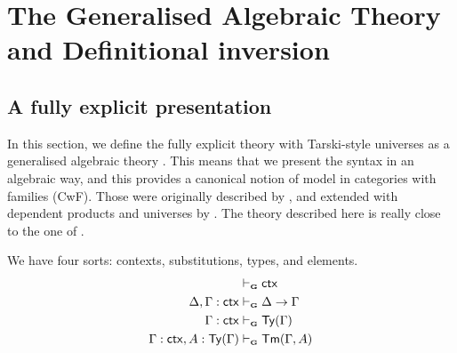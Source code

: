 \section{The Generalised Algebraic Theory and Definitional inversion}\label{GAT}

\subsection{A fully explicit presentation}

In this section, we define the fully explicit theory with Tarski-style universes as a generalised algebraic theory \ThyGAT.
This means that we present the syntax in an algebraic way, and this provides a canonical notion of model in categories with families (CwF). Those
were originally described by \citet{Cartmell}, and extended with dependent products and universes by \citet{CWF-CCD}.
The theory described here is really close to the one of \citet{bcde2026}.

\begin{definition}[Sorts]
We have four sorts: contexts, substitutions, types, and elements. 
\begin{align*}
    &\vdashG \ctx\\
    \Delta, \Gamma : \ctx &\vdashG \Delta \rightarrow \Gamma\\
    \Gamma : \ctx &\vdashG \Type(\Gamma)\\
    \Gamma : \ctx, A : \Type(\Gamma) &\vdashG \Elem(\Gamma,A)
\end{align*}
\end{definition}


